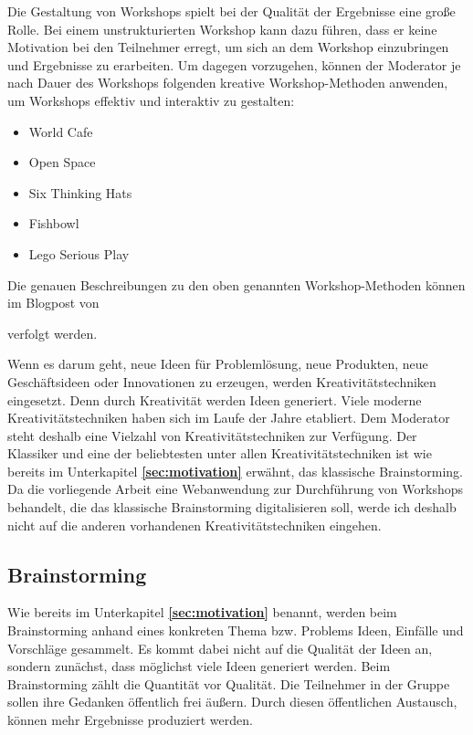 Die Gestaltung von Workshops spielt bei der Qualität der Ergebnisse eine große Rolle. Bei einem unstrukturierten Workshop kann dazu führen, dass er keine Motivation bei den Teilnehmer erregt, um sich an dem Workshop einzubringen und Ergebnisse zu erarbeiten. Um dagegen vorzugehen, können der Moderator je nach Dauer des Workshops folgenden kreative Workshop-Methoden anwenden, um Workshops effektiv und interaktiv zu gestalten:

\begin{itemize} 
\item World Cafe
\item Open Space
\item Six Thinking Hats
\item Fishbowl
\item Lego Serious Play
\end{itemize}
\medskip
Die genauen Beschreibungen zu den oben genannten Workshop-Methoden können im Blogpost von \par \cite{Cho2018} verfolgt werden.\bigskip
 
Wenn es darum geht, neue Ideen für Problemlösung, neue Produkten, neue Geschäftsideen oder Innovationen zu erzeugen, werden Kreativitätstechniken eingesetzt. Denn durch Kreativität werden Ideen generiert. Viele moderne Kreativitätstechniken haben sich im Laufe der Jahre etabliert. Dem Moderator steht deshalb eine Vielzahl von Kreativitätstechniken zur Verfügung. Der Klassiker und eine der beliebtesten unter allen Kreativitätstechniken ist wie bereits im Unterkapitel \textbf{\ref{sec:motivation}} erwähnt, das klassische Brainstorming. Da die vorliegende Arbeit eine Webanwendung zur Durchführung von Workshops behandelt, die das klassische Brainstorming digitalisieren soll, werde ich deshalb nicht auf die anderen vorhandenen Kreativitätstechniken eingehen. 

\newpage
\subsection{Brainstorming}
\label{sec:brainstorming}
Wie bereits im Unterkapitel \textbf{\ref{sec:motivation}} benannt, werden beim Brainstorming anhand eines konkreten Thema bzw. Problems Ideen, Einfälle und Vorschläge gesammelt. Es kommt dabei nicht auf die Qualität der Ideen an, sondern zunächst, dass möglichst viele Ideen generiert werden. Beim Brainstorming zählt die Quantität vor Qualität. Die Teilnehmer in der Gruppe sollen ihre Gedanken öffentlich frei äußern. Durch diesen öffentlichen Austausch, können mehr Ergebnisse produziert werden.\bigskip

